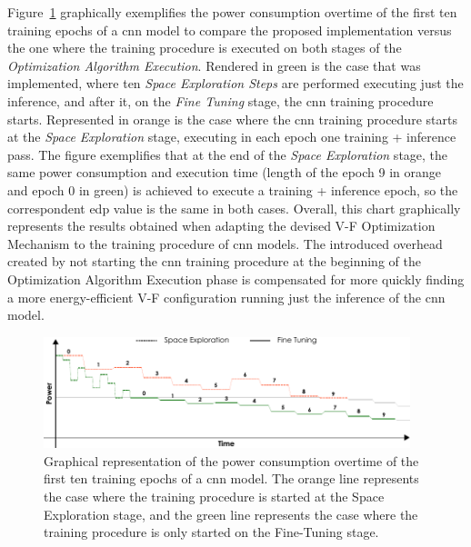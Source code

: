 Figure~\ref{fig:comp} graphically exemplifies the power consumption overtime of the first ten training epochs of a \acrshort{cnn} model to compare the proposed implementation versus the one where the training procedure is executed on both stages of the \textit{Optimization Algorithm Execution}. Rendered in green is the case that was implemented, where ten \textit{Space Exploration Steps} are performed executing just the inference, and after it, on the \textit{Fine Tuning} stage, the \acrshort{cnn} training procedure starts. Represented in orange is the case where the \acrshort{cnn} training procedure starts at the \textit{Space Exploration} stage, executing in each epoch one training + inference pass. The figure exemplifies that at the end of the \textit{Space Exploration} stage, the same power consumption and execution time (length of the epoch 9 in orange and epoch 0 in green) is achieved to execute a training + inference epoch, so the correspondent \acrshort{edp} value is the same in both cases. Overall, this chart graphically represents the results obtained when adapting the devised V-F Optimization Mechanism to the training procedure of \acrshort{cnn} models. The introduced overhead created by not starting the \acrshort{cnn} training procedure at the beginning of the Optimization Algorithm Execution phase is compensated for more quickly finding a more energy-efficient V-F configuration running just the inference of the \acrshort{cnn} model.

\begin{figure}[htb]
    \centering
        \includegraphics[width=0.95\textwidth]{Figures/Application To Deep Learning/comparacao.pdf}
        \caption{Graphical representation of the power consumption overtime of the first ten training epochs of a \acrshort{cnn} model. The orange line represents the case where the training procedure is started at the Space Exploration stage, and the green line represents the case where the training procedure is only started on the Fine-Tuning stage.}
    \label{fig:comp}
\end{figure}




